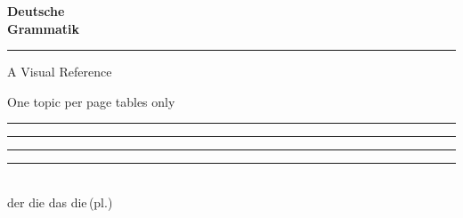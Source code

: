 \thispagestyle{empty}
\begin{center}
  \vspace*{28mm}

  {\sffamily\bfseries\fontsize{30}{34}\selectfont\color{Ink} Deutsche\\[2pt] Grammatik}

  \vspace{6mm}
  {\color{Accent}\rule{45mm}{1.6pt}}

  \vspace{6mm}
  {\sffamily\large\color{Faint} A Visual Reference}

  \vspace{4mm}
  {\sffamily\footnotesize\color{Faint} One topic per page \textbullet{} tables only}

  \vfill

  {\sffamily\footnotesize\color{Faint}
   \textcolor{Masc}{\rule{7mm}{7mm}}\;\textcolor{Fem}{\rule{7mm}{7mm}}\;%
   \textcolor{Neut}{\rule{7mm}{7mm}}\;\textcolor{Plur}{\rule{7mm}{7mm}}\\[4pt]
   der \quad die \quad das \quad die\,(pl.)}

  \vspace{18mm}
\end{center}
\cleardoublepage

